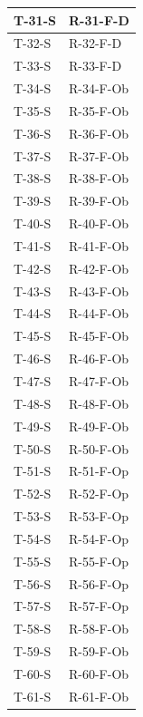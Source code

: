 \documentclass[a4paper,12pt]{article}
\begin{document}
{{\begin{longtable}{|
                    >{\centering\arraybackslash}p{}|
                    >{\centering\arraybackslash}p{}|
                }
                T-31-S & R-31-F-D \\ \hline
                T-32-S & R-32-F-D \\ \hline
                T-33-S & R-33-F-D \\ \hline
                T-34-S & R-34-F-Ob \\ \hline
                T-35-S & R-35-F-Ob \\ \hline
                T-36-S & R-36-F-Ob \\ \hline
                T-37-S & R-37-F-Ob \\ \hline
                T-38-S & R-38-F-Ob \\ \hline
                T-39-S & R-39-F-Ob \\ \hline
                T-40-S & R-40-F-Ob \\ \hline
                T-41-S & R-41-F-Ob \\ \hline
                T-42-S & R-42-F-Ob \\ \hline
                T-43-S & R-43-F-Ob \\ \hline
                T-44-S & R-44-F-Ob \\ \hline
                T-45-S & R-45-F-Ob \\ \hline
                T-46-S & R-46-F-Ob \\ \hline
                T-47-S & R-47-F-Ob \\ \hline
                T-48-S & R-48-F-Ob \\ \hline
                T-49-S & R-49-F-Ob \\ \hline
                T-50-S & R-50-F-Ob \\ \hline
                T-51-S & R-51-F-Op \\ \hline
                T-52-S & R-52-F-Op \\ \hline
                T-53-S & R-53-F-Op \\ \hline
                T-54-S & R-54-F-Op \\ \hline
                T-55-S & R-55-F-Op \\ \hline
                T-56-S & R-56-F-Op \\ \hline
                T-57-S & R-57-F-Op \\ \hline
                T-58-S & R-58-F-Ob \\ \hline
                T-59-S & R-59-F-Ob \\ \hline
                T-60-S & R-60-F-Ob \\ \hline
                T-61-S & R-61-F-Ob \\ \hline

\end{longtable}}}
\end{document}
